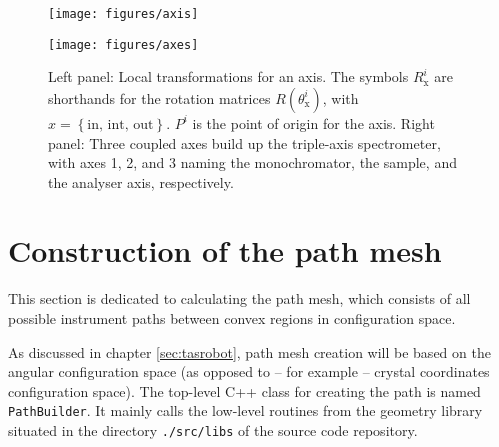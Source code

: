 \begin{figure}
	\begin{minipage}{0.45 \textwidth}
		\begin{center}
			\texttt{[image: figures/axis]}
		\end{center}
	\end{minipage}
	\begin{minipage}{0.45 \textwidth}
		\begin{center}
			\texttt{[image: figures/axes]}
		\end{center}
	\end{minipage}
	\caption[Instrument axis coordinate systems.]{
	Left panel: Local transformations for an axis. The symbols $R_{\mathrm{x}}^i$ are shorthands
	for the rotation matrices $R\left( \theta_{\mathrm{x}}^i \right)$, with $x = \left\{ \mathrm{in,\, int,\, out} \right\}$.
	$P^i$ is the point of origin for the axis.
	Right panel: Three coupled axes build up the triple-axis spectrometer, with axes 1, 2, and 3 
	naming the monochromator, the sample, and the analyser axis, respectively.
	\label{fig:tas_axes}}
\end{figure}






\section{Construction of the path mesh}
\label{sec:buildpath}
This section is dedicated to calculating the path mesh, which consists of all possible instrument paths between
convex regions in configuration space.

As discussed in chapter \ref{sec:tasrobot}, path mesh creation will be based on the angular configuration space
(as opposed to -- for example -- crystal coordinates configuration space). 
The top-level C++ class for creating the path is named \lstinline[language=C++]|PathBuilder|. 
It mainly calls the low-level routines from the geometry library situated in the directory \lstinline|./src/libs| 
of the source code repository.


